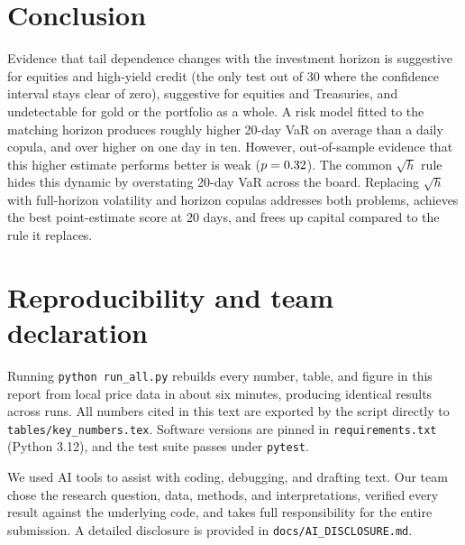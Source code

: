 \documentclass[11pt,a4paper]{article}
\begin{document}
\section{Conclusion}

Evidence that tail dependence changes with the investment horizon is suggestive for equities and high-yield credit (the only test out of 30 where the confidence interval stays clear of zero), suggestive for equities and Treasuries, and undetectable for gold or the portfolio as a whole. A risk model fitted to the matching horizon produces roughly \GapTwenty{} higher 20-day VaR on average than a daily copula, and over \GapTwentyTop{} higher on one day in ten. However, out-of-sample evidence that this higher estimate performs better is weak ($p = 0.32$). The common $\sqrt{h}$ rule hides this dynamic by overstating 20-day VaR across the board. Replacing $\sqrt{h}$ with full-horizon volatility and horizon copulas addresses both problems, achieves the best point-estimate score at 20 days, and frees up capital compared to the rule it replaces.

\section*{Reproducibility and team declaration}

Running \texttt{python run\_all.py} rebuilds every number, table, and figure in this report from local price data in about six minutes, producing identical results across runs. All numbers cited in this text are exported by the script directly to \texttt{tables/key\_numbers.tex}. Software versions are pinned in \texttt{requirements.txt} (Python 3.12), and the test suite passes under \texttt{pytest}.

We used AI tools to assist with coding, debugging, and drafting text. Our team chose the research question, data, methods, and interpretations, verified every result against the underlying code, and takes full responsibility for the entire submission. A detailed disclosure is provided in \texttt{docs/AI\_DISCLOSURE.md}.
\end{document}

